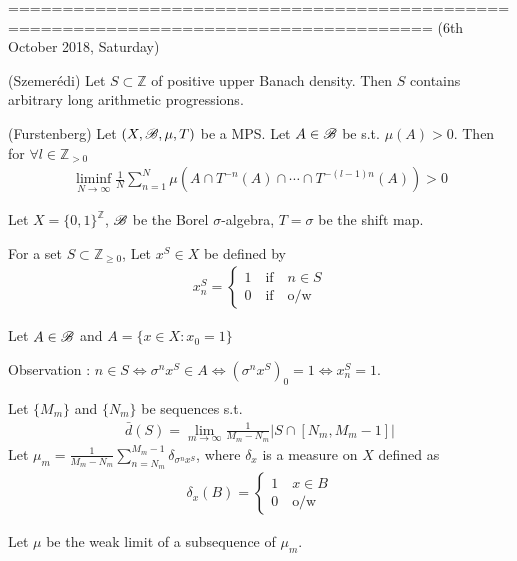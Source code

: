 \documentclass[10pt,a4paper]{report}
\begin{document}
=====================================================================================
(6th October 2018, Saturday)
\s

\thm (Szemer\'{e}di) Let $S \subset \mathbb{Z}$ of positive upper Banach density. Then $S$ contains arbitrary long arithmetic progressions. \s

\thm (Furstenberg) Let $(X,\mathscr{B},\mu, T)$ be a MPS. Let $A \in \mathscr{B}$ be s.t. $\mu(A) >0$. Then for $\forall l\in \mathbb{Z}_{>0}$
\begin{align*}
\liminf_{N\rightarrow \infty} \frac{1}{N} \sum_{n=1}^N \mu(A\cap T^{-n}(A) \cap \cdots \cap T^{-(l-1)n}(A))>0
\end{align*}
\s
\s

Let $X =\{0,1\}^{\mathbb{Z}}$, $\mathscr{B}$ be the Borel $\sigma$-algebra, $T=\sigma$ be the shift map.

For a set $S \subset \mathbb{Z}_{\geq 0}$, Let $x^S \in X$ be defined by
\begin{align*}
x_n^S =\begin{cases}
1 \quad \text{if} \quad n\in S\\
0 \quad \text{if} \quad \text{o/w} 
\end{cases}
\end{align*}

Let $A \in \mathscr{B}$ and $A = \{x\in X:x_0=1 \}$

Observation : $n\in S \Leftrightarrow \sigma^n x^S \in A \Leftrightarrow (\sigma^n x^S)_0=1 \Leftrightarrow x_n^S =1$.

Let $\{M_m\}$ and $\{N_m\}$ be sequences s.t.
\begin{align*}
\bar{d}(S) = \lim_{m\rightarrow \infty} \frac{1}{M_m - N_m} \big|S \cap [N_m,M_m-1] \big|
\end{align*}
Let $\mu_m = \frac{1}{M_m - N_m} \sum_{n=N_m}^{M_m-1} \delta_{\sigma^n x^S}$, where $\delta_x$ is a measure on $X$ defined as
\begin{align*}
\delta_x(B) = \begin{cases}
1 \quad x\in B \\
0 \quad \text{o/w}
\end{cases}
\end{align*}

Let $\mu$ be the weak limit of a subsequence of $\mu_m$.
\s
\end{document}

